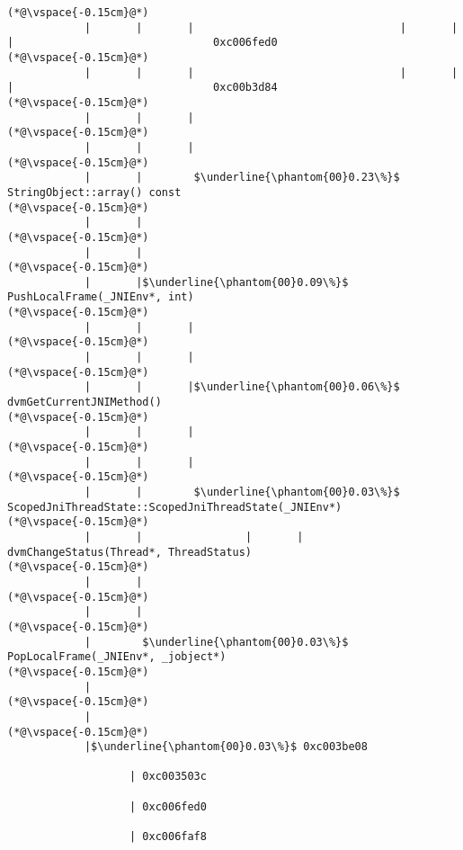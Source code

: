 \begin{lstlisting}[caption=Unicode-merkkijonon osoitinoperaatio, label=profile:C2JReadUnicode-512, numberbychapter=true, frame=lines, float, floatplacement=t]
(*@\vspace{-0.15cm}@*)
            |       |       |                                |       |       |                               0xc006fed0
(*@\vspace{-0.15cm}@*)
            |       |       |                                |       |       |                               0xc00b3d84
(*@\vspace{-0.15cm}@*)
            |       |       |
(*@\vspace{-0.15cm}@*)
            |       |       |
(*@\vspace{-0.15cm}@*)
            |       |        $\underline{\phantom{00}0.23\%}$ StringObject::array() const
(*@\vspace{-0.15cm}@*)
            |       |
(*@\vspace{-0.15cm}@*)
            |       |
(*@\vspace{-0.15cm}@*)
            |       |$\underline{\phantom{00}0.09\%}$ PushLocalFrame(_JNIEnv*, int)
(*@\vspace{-0.15cm}@*)
            |       |       |
(*@\vspace{-0.15cm}@*)
            |       |       |
(*@\vspace{-0.15cm}@*)
            |       |       |$\underline{\phantom{00}0.06\%}$ dvmGetCurrentJNIMethod()
(*@\vspace{-0.15cm}@*)
            |       |       |
(*@\vspace{-0.15cm}@*)
            |       |       |
(*@\vspace{-0.15cm}@*)
            |       |        $\underline{\phantom{00}0.03\%}$ ScopedJniThreadState::ScopedJniThreadState(_JNIEnv*)
(*@\vspace{-0.15cm}@*)
            |       |                |       |               dvmChangeStatus(Thread*, ThreadStatus)
(*@\vspace{-0.15cm}@*)
            |       |
(*@\vspace{-0.15cm}@*)
            |       |
(*@\vspace{-0.15cm}@*)
            |        $\underline{\phantom{00}0.03\%}$ PopLocalFrame(_JNIEnv*, _jobject*)
(*@\vspace{-0.15cm}@*)
            |
(*@\vspace{-0.15cm}@*)
            |
(*@\vspace{-0.15cm}@*)
            |$\underline{\phantom{00}0.03\%}$ 0xc003be08

                   | 0xc003503c

                   | 0xc006fed0

                   | 0xc006faf8


\end{lstlisting}

